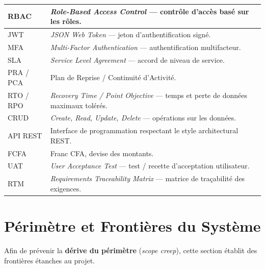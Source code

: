 \documentclass[11pt,a4paper]{article}
\begin{document}
\begin{center}
\begin{longtable}{|L{3.4cm}|L{11.0cm}|}
RBAC & \emph{Role-Based Access Control} — contrôle d'accès basé sur les rôles.\\\hline
JWT & \emph{JSON Web Token} — jeton d'authentification signé.\\\hline
MFA & \emph{Multi-Factor Authentication} — authentification multifacteur.\\\hline
SLA & \emph{Service Level Agreement} — accord de niveau de service.\\\hline
PRA / PCA & Plan de Reprise / Continuité d'Activité.\\\hline
RTO / RPO & \emph{Recovery Time / Point Objective} — temps et perte de données maximaux tolérés.\\\hline
CRUD & \emph{Create, Read, Update, Delete} — opérations sur les données.\\\hline
API REST & Interface de programmation respectant le style architectural REST.\\\hline
FCFA & Franc CFA, devise des montants.\\\hline
UAT & \emph{User Acceptance Test} — test / recette d'acceptation utilisateur.\\\hline
RTM & \emph{Requirements Traceability Matrix} — matrice de traçabilité des exigences.\\\hline
\end{longtable}
\end{center}

\section{Périmètre et Frontières du Système}

Afin de prévenir la \textbf{dérive du périmètre} (\emph{scope creep}), cette section
établit des frontières étanches au projet.
\end{document}
